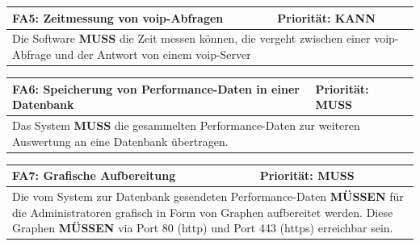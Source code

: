 \documentclass[titlepage]{report}
\begin{document}
\begin{center}
\begin{tabular}{p{}>{\raggedleft\arraybackslash}p{}}\toprule
    \textbf{FA5: Zeitmessung von \gls{voip}-Abfragen } & \textbf{Priorität: KANN} \\\midrule
	\multicolumn{2}{p{\textwidth-\tabcolsep}}{%
    Die Software \textbf{MUSS} die Zeit messen können, die vergeht
    zwischen einer \gls{voip}-Abfrage und der Antwort von einem
    \gls{voip}-Server}\\\bottomrule
\end{tabular}
\end{center}
\begin{center}
\begin{tabular}{p{}>{\raggedleft\arraybackslash}p{}}\toprule
    \textbf{FA6: Speicherung von Performance-Daten in einer Datenbank } & \textbf{Priorität: MUSS} \\\midrule
	\multicolumn{2}{p{\textwidth-\tabcolsep}}{%
        Das System \textbf{MUSS} die gesammelten Performance-Daten
        zur weiteren Auswertung an eine Datenbank übertragen.}\\\bottomrule
\end{tabular}
\end{center}
\begin{center}
\begin{tabular}{p{}>{\raggedleft\arraybackslash}p{}}\toprule
    \textbf{FA7: Grafische Aufbereitung } & \textbf{Priorität: MUSS} \\\midrule
	\multicolumn{2}{p{\textwidth-\tabcolsep}}{%
        Die vom System zur Datenbank gesendeten Performance-Daten
        \textbf{MÜSSEN} für die Administratoren grafisch in Form von
        Graphen aufbereitet werden.
        Diese Graphen \textbf{MÜSSEN} via Port 80 (\gls{http})
        und Port 443 (\gls{https}) erreichbar sein.
        }\\\bottomrule
\end{tabular}
\end{center}
\end{document}
